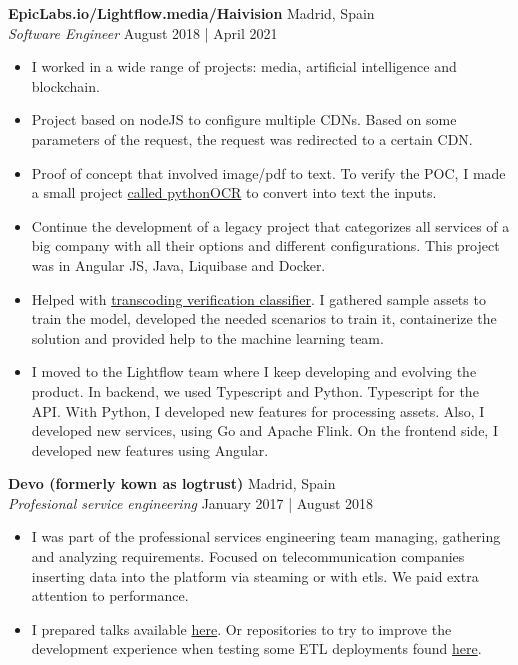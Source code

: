 \documentclass[a4paper]{article}
\begin{document}
\textbf{EpicLabs.io/Lightflow.media/Haivision} \hfill Madrid, Spain\\
\textit{Software Engineer} \hfill August 2018 | April 2021\\
\vspace{-1mm}
\begin{itemize} \itemsep 1pt
    \item I worked in a wide range of projects: media, artificial intelligence and blockchain.
    \item Project based on nodeJS to configure multiple CDNs. Based on some parameters of the request, the request was redirected to a certain CDN.
    \item Proof of concept that involved image/pdf to text. To verify the POC, I made a small project \href{https://github.com/dionisioC/pythonOCR}{called pythonOCR} to convert into text the inputs.
    \item Continue the development of a legacy project that categorizes all services of a big company with all their options and different configurations. This project was in Angular JS, Java, Liquibase and Docker.
    \item Helped with \href{https://github.com/livepeer/verification-classifier}{transcoding verification classifier}. I gathered sample assets to train the model, developed the needed scenarios to train it, containerize the solution and provided help to the machine learning team.
    \item I moved to the Lightflow team where I keep developing and evolving the product. In backend, we used Typescript and Python. Typescript for the API. With Python, I developed new features for processing assets. Also, I developed new services, using Go and Apache Flink. On the frontend side, I developed new features using Angular.
\end{itemize}

\textbf{Devo (formerly kown as logtrust)} \hfill Madrid, Spain\\
\textit{Profesional service engineering} \hfill January 2017 | August 2018\\
\vspace{-1mm}
\begin{itemize} \itemsep 1pt
	\item I was part of the professional services engineering team managing, gathering and analyzing requirements. Focused on telecommunication companies inserting data into the platform via steaming or with etls. We paid extra attention to performance.
	\item I prepared talks available \href{https://github.com/dionisioC/pythonPerformance}{here}. Or repositories to try to improve the development experience when testing some ETL deployments found \href{https://github.com/dionisioC/azkaban_in_vagrant_with_ansible}{here}.
\end{itemize}
\end{document}
